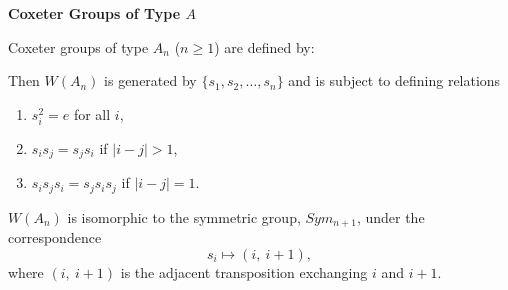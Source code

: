 \documentclass{beamer}
\begin{document}
\begin{frame}{\textbf{Coxeter Groups of Type $A$}}

Coxeter groups of type $A_{n}$ ($n\geq 1$) are defined by:
\begin{figure}
\end{figure}

\pause
 
Then $W(A_{n})$ is generated by $\{s_{1}, s_{2}, \ldots, 
s_{n}\}$ and is subject to defining relations
\begin{enumerate}
\item $s_{i}^{2}=e$ for all $i$,
\item $s_{i}s_{j}=s_{j}s_{i}$ if $|i-j|>1$,
\item $s_{i}s_{j}s_{i}=s_{j}s_{i}s_{j}$ if $|i-j|=1$.
\end{enumerate}
\pause 
$W(A_{n})$ is isomorphic to the symmetric group, $Sym_{n+1}$, under 
the correspondence 
\[
s_{i}\mapsto (i,\ i+1),
\]
where $(i,\ i+1)$ is the adjacent transposition exchanging $i$ and $i+1$.

\end{frame}

\end{document}

